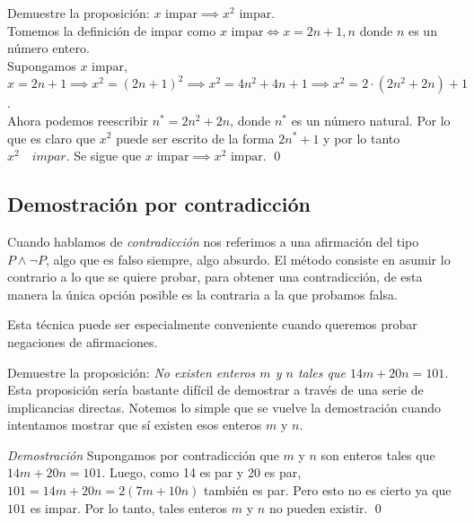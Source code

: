 \documentclass[12pt]{book}
\begin{document}
\begin{exampleenv}
Demuestre la proposición: $x \text{ impar} \implies x^2 \text{ impar}$.\\

Tomemos la definición de impar como $x \text{ impar} \iff x=2n+1,n$ donde $n$ es un número entero.\\

Supongamos $x \text{ impar}$,\\

$x=2n+1 \implies x^2=(2n+1)^2 \implies x^2 = 4n^2+4n+1 \implies x^2=2 \cdot (2n^2+2n)+1$. \\

Ahora podemos reescribir $n^*=2n^2+2n$, donde $n^*$ es un número natural. Por lo que es claro que $x^2$ puede ser escrito de la forma $2n^*+1$ y por lo tanto $x^2\quad impar$. Se sigue que $x \text{ impar} \implies x^2 \text{ impar}$. \qed
\end{exampleenv}

\subsection{Demostración por contradicción}
\noindent
Cuando hablamos de \textit{contradicción} nos referimos a una afirmación del tipo $P\wedge \neg P$, algo que es falso siempre, algo absurdo. El método consiste en asumir lo contrario a lo que se quiere probar, para obtener una contradicción, de esta manera la única opción posible es la contraria a la que probamos falsa.

Esta técnica puede ser especialmente conveniente cuando queremos probar negaciones de afirmaciones.

\begin{exampleenv}
Demuestre la proposición: \textit{No existen enteros $m$ y $n$ tales que $14m+20n=101$}.\\

Esta proposición sería bastante difícil de demostrar a través de una serie de implicancias directas. Notemos lo simple que se vuelve la demostración cuando intentamos mostrar que sí existen esos enteros $m$ y $n$.

\textit{Demostración} Supongamos por contradicción que $m$ y $n$ son enteros tales que $14m+20n=101$. Luego, como 14 es par y 20 es par, $101=14m+20n=2(7m+10n)$ también es par. Pero esto no es cierto ya que $101$ es impar. Por lo tanto, tales enteros $m$ y $n$ no pueden existir. \qed \\
\end{exampleenv}
\end{document}
